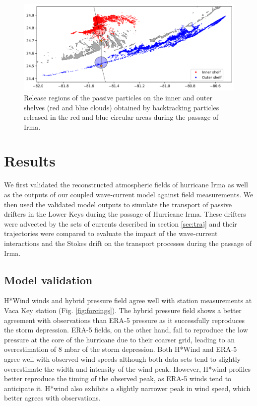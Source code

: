 \documentclass[preprint,12pt,authoryear]{elsarticle}
\begin{document}
\begin{figure}
    \centering
    \includegraphics[width=.95\textwidth]{fig/inner_outer_regions.png}
    \caption{Release regions of the passive particles on the inner and outer shelves (red and blue clouds) obtained by backtracking particles released in the red and blue circular areas during the passage of Irma.}
    \label{fig:init}
\end{figure}

\section{Results}

We first validated the reconstructed atmospheric fields of hurricane Irma as well as the outputs of our coupled wave-current model against field measurements. We then used the validated model outputs to simulate the transport of passive drifters in the Lower Keys during the passage of Hurricane Irma. These drifters were advected by the sets of currents described in section \ref{sec:traj} and their trajectories were compared to evaluate the impact of the wave-current interactions and the Stokes drift on the transport processes during the passage of Irma.

\subsection{Model validation}

H*Wind winds and hybrid pressure field agree well with station measurements at Vaca Key station (Fig. \ref{fig:forcings}). The hybrid pressure field shows a better agreement with observations than ERA-5 pressure as it successfully reproduces the storm depression. ERA-5 fields, on the other hand, fail to reproduce the low pressure at the core of the hurricane due to their coarser grid, leading to an overestimation of 8 mbar of the storm depression. Both H*Wind and ERA-5 agree well with observed wind speeds although both data sets tend to slightly overestimate the width and intensity of the wind peak. However, H*wind profiles better reproduce the timing of the observed peak, as ERA-5 winds tend to anticipate it. H*wind also exhibits a slightly narrower peak in wind speed, which better agrees with observations.
\end{document}

